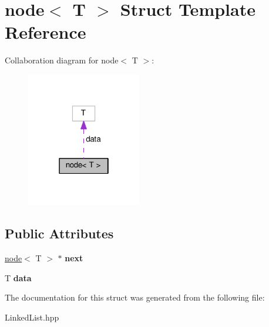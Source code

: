 \hypertarget{structnode}{}\section{node$<$ T $>$ Struct Template Reference}
\label{structnode}


Collaboration diagram for node$<$ T $>$\+:
\nopagebreak
\begin{figure}[H]
\begin{center}
\leavevmode
\includegraphics[width=142pt]{structnode__coll__graph}
\end{center}
\end{figure}
\subsection*{Public Attributes}
\begin{DoxyCompactItemize}
\item 
\mbox{\label{structnode_ac96190e012822e6c053d2a5e9eedd68d}} 
\hyperlink{structnode}{node}$<$ T $>$ $\ast$ {\bfseries next}
\item 
\mbox{\label{structnode_a0a3e961e5caf1562f0c27caef3940e7a}} 
T {\bfseries data}
\end{DoxyCompactItemize}


The documentation for this struct was generated from the following file\+:\begin{DoxyCompactItemize}
\item 
Linked\+List.\+hpp\end{DoxyCompactItemize}
